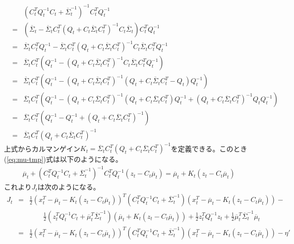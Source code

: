 \documentclass[dvipdfmx,a4paper]{jsarticle}
\begin{document}
\begin{eqnarray}
	&& \left( C_t^T Q_t^{-1} C_t + \overline{\Sigma}_t^{-1} \right)^{-1} C_t^T Q_t^{-1} \nonumber \\
	&=& \left( \overline{\Sigma}_t - \overline{\Sigma}_t C_t^T \left( Q_t + C_t \overline{\Sigma}_t C_t^T \right)^{-1} C_t \overline{\Sigma}_t \right) C_t^T Q_t^{-1} \nonumber \\
	&=& \overline{\Sigma}_t C_t^T Q_t^{-1} - \overline{\Sigma}_t C_t^T \left( Q_t + C_t \overline{\Sigma}_t C_t^T \right)^{-1} C_t \overline{\Sigma}_t C_t^T Q_t^{-1} \nonumber \\
	&=& \overline{\Sigma}_t C_t^T \left( Q_t^{-1} - \left( Q_t + C_t \overline{\Sigma}_t C_t^T \right)^{-1} C_t \overline{\Sigma}_t C_t^T Q_t^{-1} \right) \nonumber \\
	&=& \overline{\Sigma}_t C_t^T \left( Q_t^{-1} - \left( Q_t + C_t \overline{\Sigma}_t C_t^T \right)^{-1} \left( Q_t + C_t \overline{\Sigma}_t C_t^T - Q_t \right) Q_t^{-1} \right) \nonumber \\
	&=& \overline{\Sigma}_t C_t^T \left( Q_t^{-1} - \left( Q_t + C_t \overline{\Sigma}_t C_t^T \right)^{-1} \left( Q_t + C_t \overline{\Sigma}_t C_t^T \right) Q_t^{-1} + \left( Q_t + C_t \overline{\Sigma}_t C_t^T \right)^{-1} Q_t Q_t^{-1} \right) \nonumber \\
	&=& \overline{\Sigma}_t C_t^T \left( Q_t^{-1} - Q_t^{-1} + \left( Q_t + C_t \overline{\Sigma}_t C_t^T \right)^{-1} \right) \nonumber \\
	&=& \overline{\Sigma}_t C_t^T \left( Q_t + C_t \overline{\Sigma}_t C_t^T \right)^{-1}
\end{eqnarray}
上式からカルマンゲイン$K_t = \overline{\Sigma}_t C_t^T \left( Q_t + C_t \overline{\Sigma}_t C_t^T \right)^{-1}$を定義できる。このとき(\ref{eq:mu-tmp})式は以下のようになる。
\begin{eqnarray}
	\overline{\mu}_t + \left( C_t^T Q_t^{-1} C_t + \overline{\Sigma}_t^{-1} \right)^{-1} C_t^T Q_t^{-1} \left( z_t - C_t \overline{\mu}_t \right) = \overline{\mu}_t + K_t \left( z_t - C_t \overline{\mu}_t \right)
\end{eqnarray}
これより$J_t$は次のようになる。
\begin{eqnarray}
	J_t &=& \frac{1}{2} \left( x_t^T - \overline{\mu}_t - K_t \left( z_t - C_t \overline{\mu}_t \right) \right)^T \left( C_t^T Q_t^{-1} C_t + \overline{\Sigma}_t^{-1} \right) \left( x_t^T - \overline{\mu}_t - K_t \left( z_t - C_t \overline{\mu}_t \right) \right) - \nonumber \\
	&& \qquad \frac{1}{2} \left( z_t^T Q_t^{-1} C_t + \overline{\mu}_t^T \overline{\Sigma}_t^{-1} \right) \left( \overline{\mu}_t + K_t \left( z_t - C_t \overline{\mu}_t \right) \right) + \frac{1}{2} z_t^T Q_t^{-1} z_t + \frac{1}{2} \overline{\mu}_t^T \overline{\Sigma}_t^{-1} \overline{\mu}_t \nonumber \\
	&=& \frac{1}{2} \left( x_t^T - \overline{\mu}_t - K_t \left( z_t - C_t \overline{\mu}_t \right) \right)^T \left( C_t^T Q_t^{-1} C_t + \overline{\Sigma}_t^{-1} \right) \left( x_t^T - \overline{\mu}_t - K_t \left( z_t - C_t \overline{\mu}_t \right) \right) - \eta'
\end{eqnarray}
\end{document}
